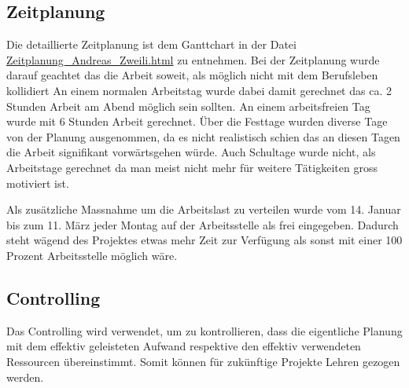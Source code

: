 \subsection{Zeitplanung}
\label{sec:org67dae7c}

Die detaillierte Zeitplanung ist dem Ganttchart in der Datei
\href{Zeitplanung\_Andreas\_Zweili.html}{Zeitplanung\_Andreas\_Zweili.html} zu entnehmen. Bei der Zeitplanung wurde darauf
geachtet das die Arbeit soweit, als möglich nicht mit dem Berufsleben
kollidiert An einem normalen Arbeitstag wurde dabei damit gerechnet das ca. 2
Stunden Arbeit am Abend möglich sein sollten. An einem arbeitsfreien Tag wurde
mit 6 Stunden Arbeit gerechnet. Über die Festtage wurden diverse Tage von der
Planung ausgenommen, da es nicht realistisch schien das an diesen Tagen die
Arbeit signifikant vorwärtsgehen würde. Auch Schultage wurde nicht, als
Arbeitstage gerechnet da man meist nicht mehr für weitere Tätigkeiten gross
motiviert ist.

Als zusätzliche Massnahme um die Arbeitslast zu verteilen wurde vom 14. Januar
bis zum 11. März jeder Montag auf der Arbeitsstelle als frei eingegeben.
Dadurch steht wägend des Projektes etwas mehr Zeit zur Verfügung als sonst mit
einer 100 Prozent Arbeitsstelle möglich wäre.

\subsection{Controlling}
\label{sec:org943b282}

Das Controlling wird verwendet, um zu kontrollieren, dass die eigentliche
Planung mit dem effektiv geleisteten Aufwand respektive den effektiv
verwendeten Ressourcen übereinstimmt. Somit können für zukünftige Projekte
Lehren gezogen werden.

